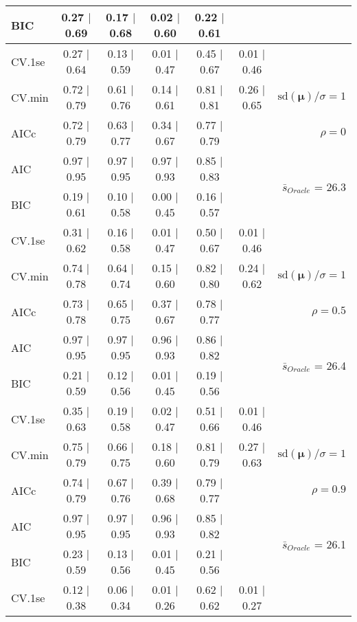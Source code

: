 \begin{table}
\begin{center}
\begin{tabular}{l*{5}{c}|r}
BIC & 0.27 $\mid$ 0.69 & 0.17 $\mid$ 0.68 & 0.02 $\mid$ 0.60 & 0.22 $\mid$ 0.61 & &  \\
 \hline 
CV.1se & 0.27 $\mid$ 0.64 & 0.13 $\mid$ 0.59 & 0.01 $\mid$ 0.47 & 0.45 $\mid$ 0.67 & 0.01 $\mid$ 0.46 & \\
CV.min & 0.72 $\mid$ 0.79 & 0.61 $\mid$ 0.76 & 0.14 $\mid$ 0.61 & 0.81 $\mid$ 0.81 & 0.26 $\mid$ 0.65 &  $\mathrm{sd}(\mathbf{\mu})/\sigma=1$ \\
AICc & 0.72 $\mid$ 0.79 & 0.63 $\mid$ 0.77 & 0.34 $\mid$ 0.67 & 0.77 $\mid$ 0.79 & & $\rho=0$ \\
AIC & 0.97 $\mid$ 0.95 & 0.97 $\mid$ 0.95 & 0.97 $\mid$ 0.93 & 0.85 $\mid$ 0.83 & &  \multirow{2}{*}{$\bar{s}_{Oracle}$ = 26.3} \\
BIC & 0.19 $\mid$ 0.61 & 0.10 $\mid$ 0.58 & 0.00 $\mid$ 0.45 & 0.16 $\mid$ 0.57 & &  \\
 \hline 
CV.1se & 0.31 $\mid$ 0.62 & 0.16 $\mid$ 0.58 & 0.01 $\mid$ 0.47 & 0.50 $\mid$ 0.67 & 0.01 $\mid$ 0.46 & \\
CV.min & 0.74 $\mid$ 0.78 & 0.64 $\mid$ 0.74 & 0.15 $\mid$ 0.60 & 0.82 $\mid$ 0.80 & 0.24 $\mid$ 0.62 &  $\mathrm{sd}(\mathbf{\mu})/\sigma=1$ \\
AICc & 0.73 $\mid$ 0.78 & 0.65 $\mid$ 0.75 & 0.37 $\mid$ 0.67 & 0.78 $\mid$ 0.77 & & $\rho=0.5$ \\
AIC & 0.97 $\mid$ 0.95 & 0.97 $\mid$ 0.95 & 0.96 $\mid$ 0.93 & 0.86 $\mid$ 0.82 & &  \multirow{2}{*}{$\bar{s}_{Oracle}$ = 26.4} \\
BIC & 0.21 $\mid$ 0.59 & 0.12 $\mid$ 0.56 & 0.01 $\mid$ 0.45 & 0.19 $\mid$ 0.56 & &  \\
 \hline 
CV.1se & 0.35 $\mid$ 0.63 & 0.19 $\mid$ 0.58 & 0.02 $\mid$ 0.47 & 0.51 $\mid$ 0.66 & 0.01 $\mid$ 0.46 & \\
CV.min & 0.75 $\mid$ 0.79 & 0.66 $\mid$ 0.75 & 0.18 $\mid$ 0.60 & 0.81 $\mid$ 0.79 & 0.27 $\mid$ 0.63 &  $\mathrm{sd}(\mathbf{\mu})/\sigma=1$ \\
AICc & 0.74 $\mid$ 0.79 & 0.67 $\mid$ 0.76 & 0.39 $\mid$ 0.68 & 0.79 $\mid$ 0.77 & & $\rho=0.9$ \\
AIC & 0.97 $\mid$ 0.95 & 0.97 $\mid$ 0.95 & 0.96 $\mid$ 0.93 & 0.85 $\mid$ 0.82 & &  \multirow{2}{*}{$\bar{s}_{Oracle}$ = 26.1} \\
BIC & 0.23 $\mid$ 0.59 & 0.13 $\mid$ 0.56 & 0.01 $\mid$ 0.45 & 0.21 $\mid$ 0.56 & &  \\
 \hline 
CV.1se & 0.12 $\mid$ 0.38 & 0.06 $\mid$ 0.34 & 0.01 $\mid$ 0.26 & 0.62 $\mid$ 0.62 & 0.01 $\mid$ 0.27 & \\

\end{tabular}
\end{center}
\end{table}
